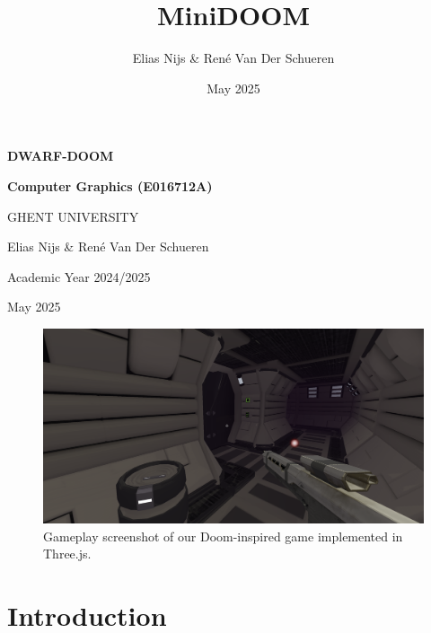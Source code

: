 \documentclass{article}
\title{MiniDOOM}
\author{Elias Nijs \& René Van Der Schueren}
\date{May 2025}
\newcommand{\courseinfo}{Computer Graphics (E016712A)}
\newcommand{\academicyear}{Academic Year 2024/2025}
\newcommand{\university}{GHENT UNIVERSITY}
\begin{document}
\begin{titlepage}
    \centering
    \vspace*{1cm}
    
    \Huge
    \textbf{DWARF-DOOM}\\
    \vspace{1.5cm}
    
    \Large
    \textbf{\courseinfo}\\
    \vspace{0.5cm}
    
    \large
    \university\\
    \vspace{0.5cm}
    
    \vspace{1.5cm}
    
    \Large
    Elias Nijs \& René Van Der Schueren\\
    \vspace{0.5cm}
    
    \large
    \academicyear\\
    \vspace{0.5cm}
    
    \large
    May 2025\\
    
\end{titlepage}

\pagebreak

\tableofcontents

\pagebreak

\begin{figure}[H]
    \centering
    \includegraphics[width=\textwidth]{diagrams/gameplay.png}
    \caption{Gameplay screenshot of our Doom-inspired game implemented in Three.js.}
    \label{fig:gameplay-main}
\end{figure}

\section{Introduction}\label{sec:introduction}
\end{document}
